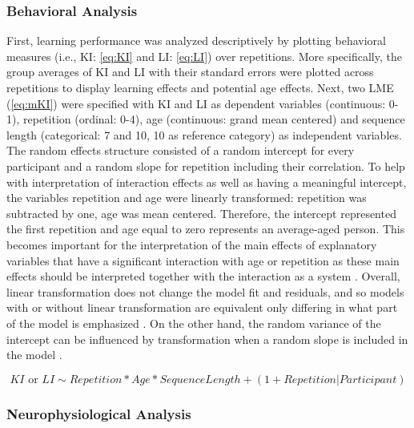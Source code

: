 \subsubsection{Behavioral Analysis} \label{sec:Behavrioalana}
First, learning performance was analyzed descriptively by plotting behavioral measures (i.e., KI: \ref{eq:KI} and LI: \ref{eq:LI}) over repetitions. More specifically, the group averages of KI and LI with their standard errors were plotted across repetitions to display learning effects and potential age effects. Next, two LME (\ref{eq:mKI}) were specified with KI and LI as dependent variables (continuous: 0-1), repetition (ordinal: 0-4), age (continuous: grand mean centered) and sequence length (categorical: 7 and 10, 10 as reference category) as independent variables. The random effects structure consisted of a random intercept for every participant and a random slope for repetition including their correlation. To help with interpretation of interaction effects as well as having a meaningful intercept, the variables repetition and age were linearly transformed: repetition was subtracted by one, age was mean centered. Therefore, the intercept represented the first repetition and age equal to zero represents an average-aged person. This becomes important for the interpretation of the main effects of explanatory variables that have a significant interaction with age or repetition as these main effects should be interpreted together with the interaction as a system \parencite{hoxMultilevelAnalysisTechniques2017}. Overall, linear transformation does not change the model fit and residuals, and so models with or without linear transformation are equivalent only differing in what part of the model is emphasized \parencite{hoxMultilevelAnalysisTechniques2017}. On the other hand, the random variance of the intercept can be influenced by transformation when a random slope is included in the model \parencite{hoxMultilevelAnalysisTechniques2017}. 

\begin{equation}\label{eq:mKI}
KI \textrm{ or } LI   \sim  Repetition*Age*SequenceLength + (1+Repetition | Participant)
\end{equation}

\subsubsection{Neurophysiological Analysis}
